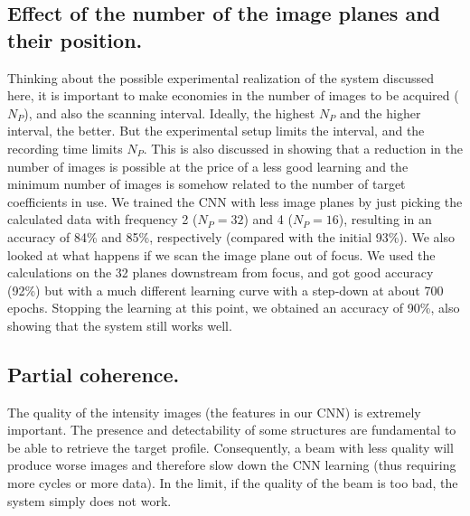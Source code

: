 \documentclass[preprint]{iucr}
\begin{document}
\subsection{Effect of the number of the image planes and their position.}
Thinking about the possible experimental realization of the system discussed here, it is important to make economies in the number of images to be acquired ($N_P$), and also the scanning interval. Ideally, the highest $N_P$ and the higher interval, the better. But the experimental setup limits the interval, and the recording time limits $N_P$. This is also discussed in \cite{Saha2020} showing that a reduction in the number of images is possible at the price of a less good learning and the minimum number of images is somehow related to the number of target coefficients in use. We trained the CNN with less image planes by just picking the calculated data with frequency 2 ($N_P=32$) and 4 ($N_P=16$), resulting in an accuracy of 84\% and 85\%, respectively (compared with the initial 93\%). 
We also looked at what happens if we scan the image plane out of focus. We used the calculations on the 32 planes downstream from focus, and got good accuracy (92\%) but with a much different learning curve with a step-down at about 700 epochs. Stopping the learning at this point, we obtained an accuracy of 90\%, also showing that the system still works well. 



\subsection{Partial coherence.}
The quality of the intensity images (the features in our CNN) is extremely important. The presence and detectability of some structures are fundamental to be able to retrieve the target profile. Consequently, a beam with less quality will produce worse images and therefore slow down the CNN learning (thus requiring more cycles or more data). In the limit, if the quality of the beam is too bad, the system simply does not work.  
\end{document}
